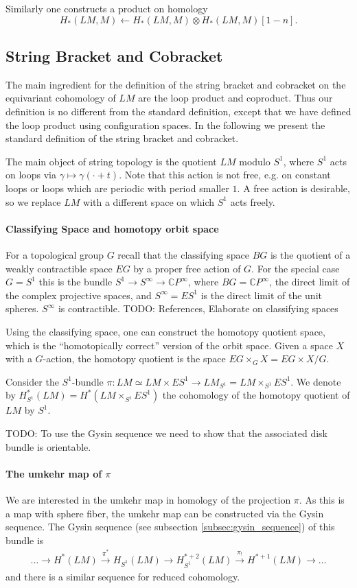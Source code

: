 \documentclass{scrartcl}
\theoremstyle{plain}
\theoremstyle{definition}
\newcommand{\C}{\mathbb C}
\newcommand{\from}{\leftarrow}
\begin{document}
Similarly one constructs a product on homology $$H_*(LM, M) \from H_{*}(LM, M)\otimes H_*(LM, M)[1-n].$$


\subsection{String Bracket and Cobracket}
The main ingredient for the definition of the string bracket and cobracket on the equivariant cohomology of $LM$ are the loop product and coproduct. Thus our definition is no different from the standard definition, except that we have defined the loop product using configuration spaces. In the following we present the standard definition of the string bracket and cobracket.

The main object of string topology is the quotient $LM$ modulo $S^1$, where $S^1$ acts on loops via $\gamma\mapsto \gamma(\cdot + t)$. Note that this action is not free, e.g. on constant loops or loops which are periodic with period smaller $1$. A free action is desirable, so we replace $LM$ with a different space on which $S^1$ acts freely.

\paragraph{Classifying Space and homotopy orbit space} For a topological group $G$ recall that the classifying space $BG$ is the quotient of a weakly contractible space $EG$ by a proper free action of $G$. For the special case $G=S^1$ this is the bundle $S^1\to S^\infty\to \C P^\infty$, where $BG = \C P^\infty$, the direct limit of the complex projective spaces, and $S^\infty = ES^1$ is the direct limit of the unit spheres. $S^\infty$ is contractible. TODO: References, Elaborate on classifying spaces

Using the classifying space, one can construct the homotopy quotient space, which is the ``homotopically correct'' version of the orbit space. Given a space $X$ with a $G$-action, the homotopy quotient is the space $EG\times_G X = EG\times X / G$. 

Consider the $S^1$-bundle $\pi\colon LM\simeq LM\times ES^1\to LM_{S^1} = LM\times_{S^1} ES^1$. We denote by $H^*_{S^1}(LM) = H^*(LM\times_{S^1} ES^1)$ the cohomology of the homotopy quotient of $LM$ by $S^1$. 

TODO: To use the Gysin sequence we need to show that the associated disk bundle is orientable.

\paragraph{The umkehr map of $\pi$} We are interested in the umkehr map in homology of the projection $\pi$. As this is a map with sphere fiber, the umkehr map can be constructed via the Gysin sequence. The Gysin sequence (see subsection \ref{subsec:gysin_sequence}) of this bundle is 
\begin{align*}
    \dots \to H^*(LM)\xrightarrow{\pi^*} H_{S^1}(LM) \to H^{*+2}_{S^1}(LM) \xrightarrow{\pi_!} H^{*+1}(LM) \to \dots
\end{align*}
and there is a similar sequence for reduced cohomology. 
\end{document}
